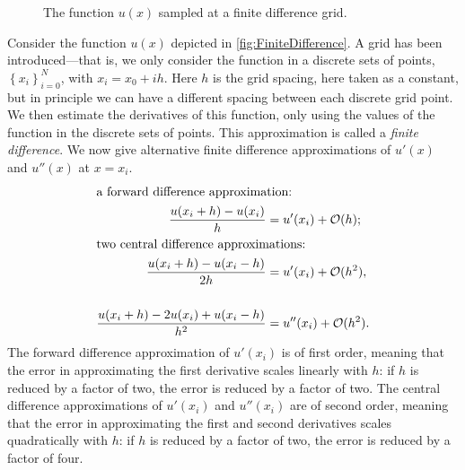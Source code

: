 \begin{figure}
  \centering
  \caption{The function $u(x)$ sampled at a finite difference grid.}
  \label{fig:FiniteDifference}
\end{figure}

Consider the function $u(x)$ depicted in \autoref{fig:FiniteDifference}. A grid
has been introduced---that is, we only consider the function in a discrete sets
of points, $\left\{x_i\right\}_{i=0}^N$, with $x_i = x_0+ih$. Here $h$ is the
grid spacing, here taken as a constant, but in principle we can have a different
spacing between each discrete grid point. We then estimate the derivatives of
this function, only using the values of the function in the discrete sets of
points. This approximation is called a \emph{finite difference}. We now give
alternative finite difference approximations of $u'(x)$ and $u''(x)$ at $x=x_i$.
\begin{align*}
  \intertext{a forward difference approximation:}
  \frac{u(x_i+h)-u(x_i)}{h} &= u'(x_i) + \mathcal{O}(h); \\
  \intertext{two central difference approximations:}
  \frac{u(x_i+h)-u(x_i-h)}{2 h} &= u'(x_i) + \mathcal{O}(h^2), \\ \\
  \frac{u(x_i+h)-2 u(x_i)+u(x_i-h)}{h^2} &= u''(x_i) + \mathcal{O}(h^2).
\end{align*}
The forward difference approximation of $u'(x_i)$ is of first order, meaning
that the error in approximating the first derivative scales linearly with $h$:
if $h$ is reduced by a factor of two, the error is reduced by a factor of two.
The central difference approximations of $u'(x_i)$ and $u''(x_i)$ are of second
order, meaning that the error in approximating the first and second derivatives
scales quadratically with $h$: if $h$ is reduced by a factor of two, the error
is reduced by a factor of four.

